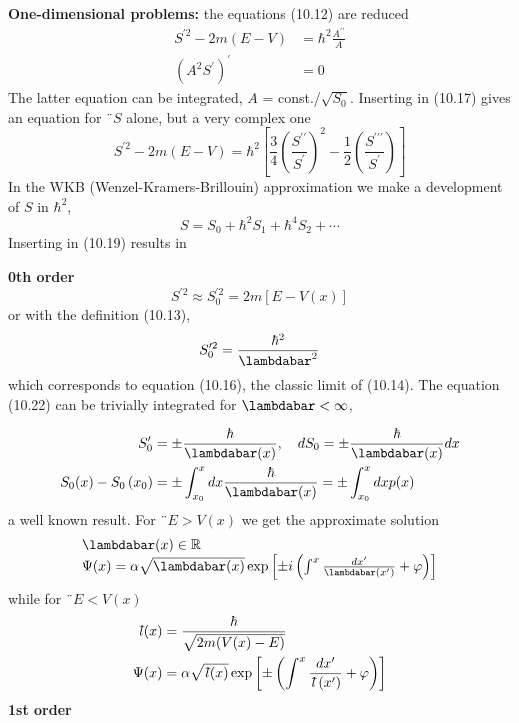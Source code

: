 \textbf{One-dimensional problems:} the equations (10.12) are reduced
\begin{align} S^{\prime 2}-2 m(E-V) &=\hbar^{2} \frac{A^{\prime \prime}}{A} \\\left(A^{2} S^{\prime}\right)^{\prime} &=0 \end{align}
The latter equation can be integrated, $A$ = const./$\sqrt{S_0}$. Inserting in (10.17) gives an equation for $¨ S$ alone, but a very complex one
\begin{equation}
    S^{\prime 2}-2 m(E-V)=\hbar^{2}\left[\frac{3}{4}\left(\frac{S^{\prime \prime}}{S^{\prime}}\right)^{2}-\frac{1}{2}\left(\frac{S^{\prime \prime \prime}}{S^{\prime}}\right)\right]
    \end{equation}
In the WKB (Wenzel-Kramers-Brillouin) approximation we make a development of $S$ in $\hbar^2$,
\begin{equation}
    S=S_{0}+\hbar^{2} S_{1}+\hbar^{4} S_{2}+\cdots
    \end{equation}
Inserting in (10.19) results in\par
\textbf{0th order}
\begin{equation}
    S^{\prime 2} \approx S_{0}^{\prime 2}=2 m[E-V(x)]
    \end{equation}
or with the definition (10.13),
\begin{equation}
    S_{0}^{\prime 2}=\frac{\hbar^{2}}{\lambdabar^{2}}
    \end{equation}
which corresponds to equation (10.16), the classic limit of (10.14). The equation (10.22) can be trivially integrated for $\lambdabar<\infty$,

\begin{equation}
\begin{aligned} S_{0}^{\prime} &=\pm \frac{\hbar}{\lambdabar(x)}, \quad d S_{0}=\pm \frac{\hbar}{\lambdabar(x)} d x \\ S_{0}(x)-S_{0}\left(x_{0}\right) &=\pm \int_{x_{0}}^{x} d x \frac{\hbar}{\lambdabar(x)}=\pm \int_{x_{0}}^{x} d x p(x) \end{aligned}
\end{equation}
a well known result. For $¨ E> V (x)$ we get the approximate solution
\begin{equation}
\begin{array}{l}{\lambdabar(x) \in \mathbb{R}} \\ {\Psi(x)=\alpha \sqrt{\lambdabar(x)} \exp \left[\pm i\left(\int^{x} \frac{d x^{\prime}}{\lambdabar\left(x^{\prime}\right)}+\varphi\right)\right]}\end{array}
\end{equation}
while for $¨ E <V (x)$
\begin{equation}
\begin{aligned} \lbar(x) &=\frac{\hbar}{\sqrt{2 m(V(x)-E)}} \\ \Psi(x) &=\alpha \sqrt{\lbar(x)} \exp \left[\pm\left(\int^{x} \frac{d x^{\prime}}{\lbar\left(x^{\prime}\right)}+\varphi\right)\right] \end{aligned}
\end{equation}
\textbf{1st order}

